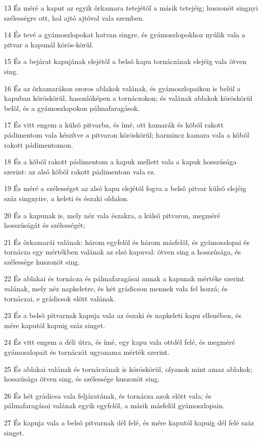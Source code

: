 \par 13 És méré a kaput az egyik õrkamara tetejétõl a másik tetejéig; huszonöt singnyi szélességre ott, hol ajtó ajtóval vala szemben.
\par 14 És tevé a gyámoszlopokat hatvan singre, és gyámoszlopokhoz nyúlik vala a pitvar a kapunál körös-körül.
\par 15 És a bejárat kapujának elejétõl a belsõ kapu tornáczának elejéig vala ötven sing.
\par 16 És az õrkamarákon szoros ablakok valának, és gyámoszlopaikon is belül a kapuban köröskörül, hasonlóképen a tornáczokon; és valának ablakok köröskörül belõl, és a gyámoszlopokon pálmafaragások.
\par 17 És vitt engem a külsõ pitvarba, és ímé, ott kamarák és kõbõl rakott pádimentom vala készítve a pitvaron köröskörül; harmincz kamara vala a kõbõl rakott pádimentomon.
\par 18 És a kõbõl rakott pádimentom a kapuk mellett vala a kapuk hosszúsága szerint: az alsó kõbõl rakott pádimentom vala ez.
\par 19 És méré a szélességet az alsó kapu elejétõl fogva a belsõ pitvar külsõ elejéig száz singnyire, a keleti és északi oldalon.
\par 20 És a kapunak is, mely néz vala északra, a külsõ pitvaron, megméré hosszúságát és szélességét;
\par 21 És õrkamarái valának: három egyfelõl és három másfelõl, és gyámoszlopai és tornácza egy mértékben valának az elsõ kapuval: ötven sing a hosszúsága, és szélessége huszonöt sing.
\par 22 És ablakai és tornácza és pálmafaragásai annak a kapunak mértéke szerint valának, mely néz napkeletre, és hét grádicson mennek vala fel hozzá; és tornáczai, e grádicsok elõtt valának.
\par 23 És a belsõ pitvarnak kapuja vala az északi és napkeleti kapu ellenében, és mére kaputól kapuig száz singet.
\par 24 És vitt engem a déli útra, és ímé, egy kapu vala ottdél felé, és megméré gyámoszlopait és tornáczát ugyanama mérték szerint.
\par 25 És ablakai valának és tornáczának is köröskörül, olyanok mint amaz ablakok; hosszúsága ötven sing, és szélessége huszonöt sing.
\par 26 És hét grádicsa vala feljáratának, és tornácza azok elõtt vala; és pálmafaragásai valának egyik egyfelõl, a másik másfelõl gyámoszlopain.
\par 27 És kapuja vala a belsõ pitvarnak dél felé, és mére kaputól kapuig dél felé száz singet.
